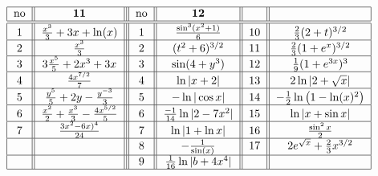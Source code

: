 \[ \begin{tabular}{| c || c || | c | | c | | c | | c | c | }
\hline  no &         ${\bf 11}                                                         $    & no     &        ${\bf 12}  $                           	         &          &       \\    \hline \hline
           $1$   &      $\frac{x^3}{3}+3x+\ln(x)                        $  & $1$  &   $\frac{\sin^3(x^2+1)}{6}$     		&$10$&  $\frac{2}{3}(2+t)^{3/2}$  \\ \hline 
           $2$   &      $ \frac{x^3}{3}                                              $   & $2$  &  $(t^2+6)^{3/2}       $          		&$11$&  $\frac{2}{3}(1+e^x)^{3/2}$ \\ \hline
           $3$   &      $3\frac{x^5}{5} + 2x^3+3x                         $   & $3$  & $\sin(4+y^3)	 $      &$12$&  $\frac{1}{9}(1+e^{3x})^3$  \\ \hline
           $4$   &      $\frac{4x^{7/2}}{7}                                       $   &  $4$ & $\ln| x+2|$    					&$13$&  $ 2\ln  | 2+\sqrt x | $\\ \hline 
           $5$   &      $\frac{y^5}{5}+2y-\frac{y^{-3}}{3}                   $   &  $5$ &  $-\ln| \cos x|$       		&$14$		&$-\frac{1}{ 2 }\ln\big( 1-\ln(x)^2 \big)$ \\ \hline
           $6$   &      $\frac{x^2}{2}+\frac{x^3}{3}-\frac{4x^{5/2}}{5}	 $    & $6$  & $\frac{-1}{14}\ln| 2 - 7 x^2|       $        &$15$& $\ln  |x+ \sin x | $ \\ \hline
           $7$   &      $\frac{3x^2-6x)^4}{24}   			 $    & $7$  & $ \ln |1 + \ln x|  $                  &$16$& $\frac{\sin^2x}{2}$  \\ \hline
                     &                        					      & $8$  & $-\frac{1}{\sin( x )}$                         &$17$ & $2e^{\sqrt x} + \frac{2}{3}x^{3/2} $\\ \hline
                     &      $      					         $     & $9$  & $ \frac{1}{16}\ln  | b+4x^4 | $                &          &                           \\  \hline
                 
             
\end{tabular} \]


